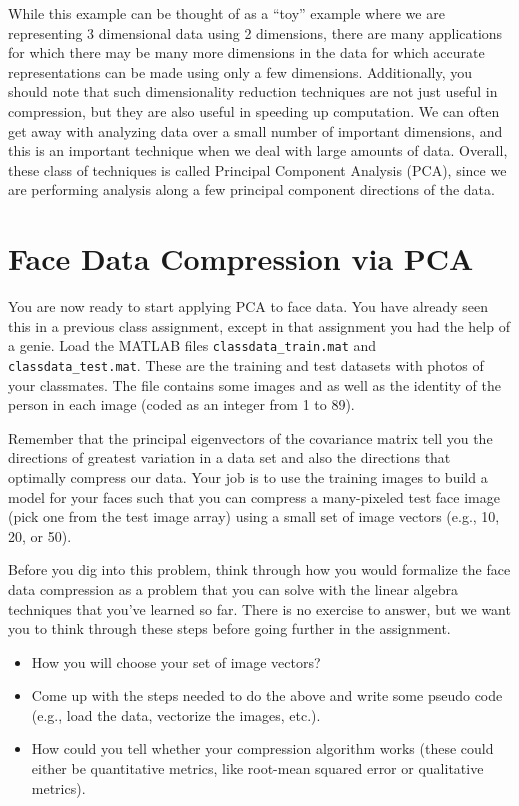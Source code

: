 While this example can be thought of as a ``toy'' example where we are representing 3 dimensional data using 2 dimensions, there are many applications for which there may be many more dimensions in the data for which accurate representations can be made using only a few dimensions. Additionally, you should note that such dimensionality reduction techniques are not just useful in compression, but they are also useful in speeding up computation. We can often get away with analyzing data over a small number of important dimensions, and this is an important technique when we deal with large amounts of data. Overall, these class of techniques is called Principal Component Analysis (PCA), since we are performing analysis along a few principal component directions of the data.

\section{Face Data Compression via PCA}

You are now ready to start applying PCA to face data.   You have already seen this in a previous class assignment, except in that assignment you had the help of a genie.  Load the MATLAB files \texttt{classdata\_train.mat} and \texttt{classdata\_test.mat}. These are the training and test datasets with photos of your classmates. The file contains some images and as well as the identity of the person in each image (coded as an integer from 1 to 89).%

Remember that the principal eigenvectors of the covariance matrix tell you the directions of greatest variation in a data set and also the directions that optimally compress our data.  Your job is to use the training images to build a model for your faces such that you can compress a many-pixeled test face image (pick one from the test image array) using a small set of image vectors (e.g., 10, 20, or 50).

Before you dig into this problem, think through how you would formalize the face data compression as a problem that you can solve with the linear algebra techniques that you've learned so far.  There is no exercise to answer, but we want you to think through these steps before going further in the assignment.

\begin{itemize}
\item How you will choose your set of image vectors?
\item Come up with the steps needed to do the above and write some pseudo code (e.g., load the data, vectorize the images, etc.).
\item How could you tell whether your compression algorithm works (these could either be quantitative metrics, like root-mean squared error or qualitative metrics).
\end{itemize}

